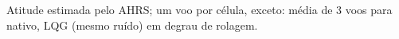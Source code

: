Atitude estimada pelo AHRS; um voo por célula, exceto: média de 3 voos para nativo, LQG (mesmo ruído) em degrau de rolagem.
